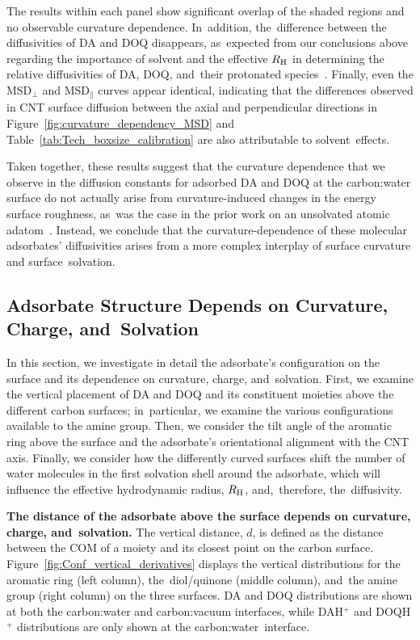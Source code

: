 \documentclass[molecules,article,accept,pdftex,moreauthors]{Definitions/mdpi}
\begin{document}
The results within each panel show significant overlap of the shaded regions and no observable curvature dependence. In~addition, the~difference between the diffusivities of DA and DOQ disappears, as~expected from our conclusions above regarding the importance of solvent and the effective $R_{\rm H}$ in determining the relative diffusivities of DA, DOQ, and~their protonated species~\cite{Jia2022}. Finally, even the MSD$_{\perp}$ and MSD$_{\parallel}$ curves appear identical, indicating that the differences observed in CNT surface diffusion between the axial and perpendicular directions in Figure~\ref{fig:curvature_dependency_MSD} and Table~\ref{tab:Tech_boxsize_calibration} are also attributable to solvent~effects.

Taken together, these results suggest that the curvature dependence that we observe in the diffusion constants for adsorbed DA and DOQ at the carbon:water surface do not actually arise from curvature-induced changes in the energy surface roughness, as~was the case in the prior work on an unsolvated atomic adatom~\cite{Shu2001}. Instead, we conclude that the curvature-dependence of these molecular adsorbates' diffusivities arises from a more complex interplay of surface curvature and surface~solvation. 

\subsection{Adsorbate Structure Depends on Curvature, Charge, and~Solvation}

In this section, we investigate in detail the adsorbate's configuration on the surface and its dependence on curvature, charge, and~solvation. First, we examine the vertical placement of DA and DOQ and its constituent moieties above the different carbon surfaces; in~particular, we examine the various configurations available to the amine group. Then, we consider the tilt angle of the aromatic ring above the surface and the adsorbate's orientational alignment with the CNT axis. Finally, we consider how the differently curved surfaces shift the number of water molecules in the first solvation shell around the adsorbate, which will influence the effective hydrodynamic radius, $R_{\rm H}$, and,~therefore, the~diffusivity.



{\bf The distance of the adsorbate above the surface depends on curvature, charge, and~solvation.} %
The vertical distance, $d$, is defined as the distance between the COM of a moiety and its closest point on the carbon surface. Figure~\ref{fig:Conf_vertical_derivatives} displays the vertical distributions for the aromatic ring (left column), the~diol/quinone (middle column), and~the amine group (right column) on the three surfaces. DA and DOQ distributions are shown at both the carbon:water and carbon:vacuum interfaces, while DAH$^+$ and DOQH$^+$ distributions are only shown at the carbon:water~interface. 
\end{document}

